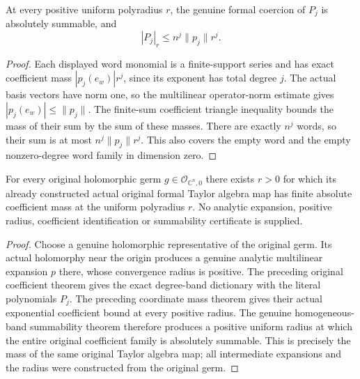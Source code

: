 \begin{theorem}
\label{hir:actual-multilinear-coordinate-polynomial-mass}
\leanok
At every positive uniform polyradius $r$, the genuine formal coercion of $P_j$ is absolutely summable, and
\[
 |P_j|_r\le n^j\|p_j\|r^j.
\]
\end{theorem}
\begin{proof}
Each displayed word monomial is a finite-support series and has exact coefficient mass $|p_j(e_w)|r^j$, since its exponent has total degree $j$. The actual basis vectors have norm one, so the multilinear operator-norm estimate gives $|p_j(e_w)|\le\|p_j\|$. The finite-sum coefficient triangle inequality bounds the mass of their sum by the sum of these masses. There are exactly $n^j$ words, so their sum is at most $n^j\|p_j\|r^j$. This also covers the empty word and the empty nonzero-degree word family in dimension zero.
\end{proof}

\begin{theorem}
\label{hir:actual-original-taylor-positive-coefficient-mass}
\leanok
For every original holomorphic germ $g\in\mathcal O_{\mathbb C^n,0}$ there exists $r>0$ for which its already constructed actual original formal Taylor algebra map has finite absolute coefficient mass at the uniform polyradius $r$.
No analytic expansion, positive radius, coefficient identification or summability certificate is supplied.
\end{theorem}
\begin{proof}
Choose a genuine holomorphic representative of the original germ. Its actual holomorphy near the origin produces a genuine analytic multilinear expansion $p$ there, whose convergence radius is positive. The preceding original coefficient theorem gives the exact degree-band dictionary with the literal polynomials $P_j$. The preceding coordinate mass theorem gives their actual exponential coefficient bound at every positive radius. The genuine homogeneous-band summability theorem therefore produces a positive uniform radius at which the entire original coefficient family is absolutely summable. This is precisely the mass of the same original Taylor algebra map; all intermediate expansions and the radius were constructed from the original germ.
\end{proof}

